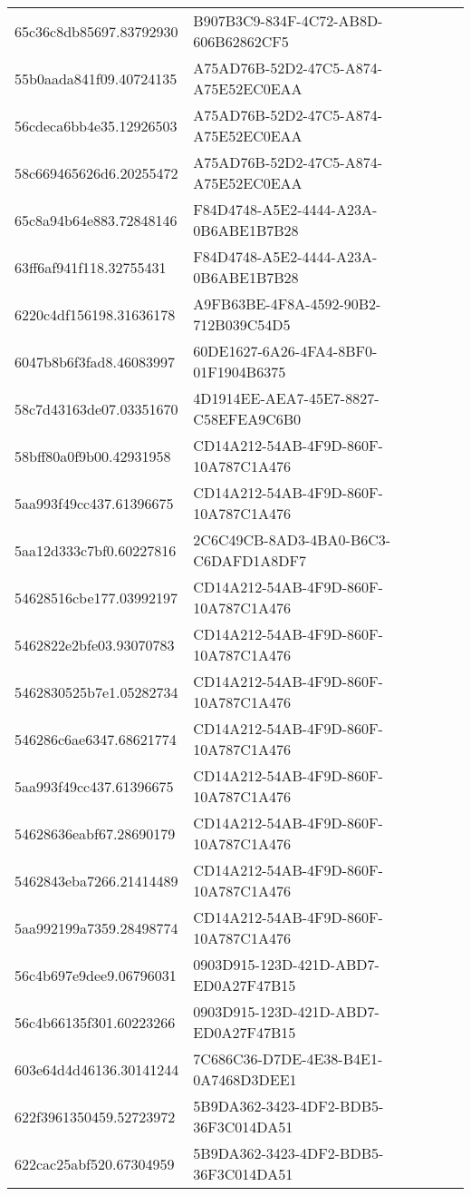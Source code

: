 \begin{tabular}{ll}
65c36c8db85697.83792930 & B907B3C9-834F-4C72-AB8D-606B62862CF5 \\
55b0aada841f09.40724135 & A75AD76B-52D2-47C5-A874-A75E52EC0EAA \\
56cdeca6bb4e35.12926503 & A75AD76B-52D2-47C5-A874-A75E52EC0EAA \\
58c669465626d6.20255472 & A75AD76B-52D2-47C5-A874-A75E52EC0EAA \\
65c8a94b64e883.72848146 & F84D4748-A5E2-4444-A23A-0B6ABE1B7B28 \\
63ff6af941f118.32755431 & F84D4748-A5E2-4444-A23A-0B6ABE1B7B28 \\
6220c4df156198.31636178 & A9FB63BE-4F8A-4592-90B2-712B039C54D5 \\
6047b8b6f3fad8.46083997 & 60DE1627-6A26-4FA4-8BF0-01F1904B6375 \\
58c7d43163de07.03351670 & 4D1914EE-AEA7-45E7-8827-C58EFEA9C6B0 \\
58bff80a0f9b00.42931958 & CD14A212-54AB-4F9D-860F-10A787C1A476 \\
5aa993f49cc437.61396675 & CD14A212-54AB-4F9D-860F-10A787C1A476 \\
5aa12d333c7bf0.60227816 & 2C6C49CB-8AD3-4BA0-B6C3-C6DAFD1A8DF7 \\
54628516cbe177.03992197 & CD14A212-54AB-4F9D-860F-10A787C1A476 \\
5462822e2bfe03.93070783 & CD14A212-54AB-4F9D-860F-10A787C1A476 \\
5462830525b7e1.05282734 & CD14A212-54AB-4F9D-860F-10A787C1A476 \\
546286c6ae6347.68621774 & CD14A212-54AB-4F9D-860F-10A787C1A476 \\
5aa993f49cc437.61396675 & CD14A212-54AB-4F9D-860F-10A787C1A476 \\
54628636eabf67.28690179 & CD14A212-54AB-4F9D-860F-10A787C1A476 \\
5462843eba7266.21414489 & CD14A212-54AB-4F9D-860F-10A787C1A476 \\
5aa992199a7359.28498774 & CD14A212-54AB-4F9D-860F-10A787C1A476 \\
56c4b697e9dee9.06796031 & 0903D915-123D-421D-ABD7-ED0A27F47B15 \\
56c4b66135f301.60223266 & 0903D915-123D-421D-ABD7-ED0A27F47B15 \\
603e64d4d46136.30141244 & 7C686C36-D7DE-4E38-B4E1-0A7468D3DEE1 \\
622f3961350459.52723972 & 5B9DA362-3423-4DF2-BDB5-36F3C014DA51 \\
622cac25abf520.67304959 & 5B9DA362-3423-4DF2-BDB5-36F3C014DA51 \\

\end{tabular}
